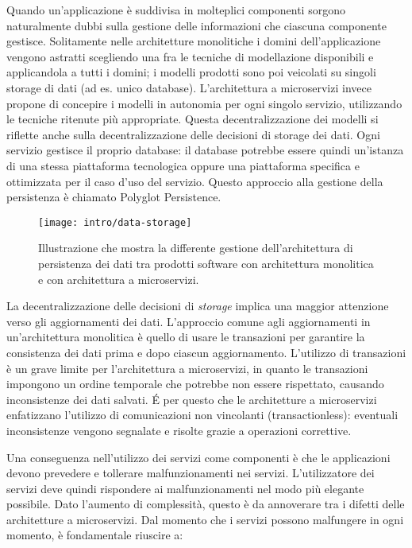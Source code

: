 Quando un'applicazione è suddivisa in molteplici componenti sorgono naturalmente dubbi sulla gestione delle informazioni che ciascuna componente gestisce.
Solitamente nelle architetture monolitiche i domini dell'applicazione vengono astratti scegliendo una fra le tecniche di modellazione disponibili e applicandola a tutti i domini;
i modelli prodotti sono poi veicolati su singoli storage di dati (ad es. unico database).
L'architettura a microservizi invece propone di concepire i modelli in autonomia per ogni singolo servizio, utilizzando le tecniche ritenute più appropriate.
Questa decentralizzazione dei modelli si riflette anche sulla decentralizzazione delle decisioni di storage dei dati.
Ogni servizio gestisce il proprio database: il database potrebbe essere quindi un'istanza di una stessa piattaforma tecnologica oppure una piattaforma specifica e ottimizzata per il caso d'uso del servizio.
Questo approccio alla gestione della persistenza è chiamato Polyglot Persistence.

\begin{figure}[!ht]
    \centering
    \texttt{[image: intro/data-storage]}
    \caption{Illustrazione che mostra la differente gestione dell'architettura di persistenza dei dati tra prodotti software con architettura monolitica e con architettura a microservizi.}
    \label{fig:data-storage}
\end{figure}

La decentralizzazione delle decisioni di \emph{storage} implica una maggior attenzione verso gli aggiornamenti dei dati.
L'approccio comune agli aggiornamenti in un'architettura monolitica è quello di usare le transazioni per garantire la consistenza dei dati prima e dopo ciascun aggiornamento.
L'utilizzo di transazioni è un grave limite per l'architettura a microservizi, in quanto le transazioni impongono un ordine temporale che potrebbe non essere rispettato, causando inconsistenze dei dati salvati.
É per questo che le architetture a microservizi enfatizzano l'utilizzo di comunicazioni non vincolanti (transactionless): eventuali inconsistenze vengono segnalate e risolte grazie a operazioni correttive.

Una conseguenza nell'utilizzo dei servizi come componenti è che le applicazioni devono prevedere e tollerare malfunzionamenti nei servizi. L'utilizzatore dei servizi deve quindi rispondere ai malfunzionamenti nel modo più elegante possibile. Dato l'aumento di complessità, questo è da annoverare tra i difetti delle architetture a microservizi. Dal momento che i servizi possono malfungere in ogni momento, è fondamentale riuscire a:

